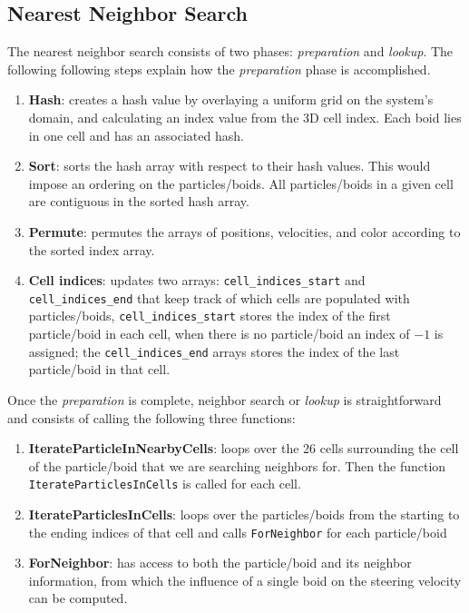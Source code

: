 \subsection{Nearest Neighbor Search}
The nearest neighbor search consists of two phases: \textit{preparation} and \textit{lookup}. The following following steps explain how the \textit{preparation} phase is accomplished.

\begin{enumerate}
\item{\textbf{Hash}: creates a hash value by overlaying a uniform grid on the system's domain, and calculating an index value from the 3D cell index. Each boid lies in one cell and has an associated hash.}
\item{\textbf{Sort}: sorts the hash array with respect to their hash values. This would impose an ordering on the particles/boids. All particles/boids in a given cell are contiguous in the sorted hash array.}
\item{\textbf{Permute}:  permutes the arrays of positions, velocities, and color according to the sorted index array.}
\item{\textbf{Cell indices}: updates two arrays: \texttt{cell\_indices\_start} and \texttt{cell\_indices\_end} that keep track of which cells are populated with particles/boids, \texttt{cell\_indices\_start} stores the index of the first particle/boid in each cell, when there is no particle/boid an index of $-1$ is assigned; the \texttt{cell\_indices\_end} arrays stores the index of the last particle/boid in that cell.}
\end{enumerate}

Once the \textit{preparation} is complete, neighbor search or \textit{lookup} is straightforward and consists of calling the following three functions:  

\begin{enumerate}
\item{\textbf{IterateParticleInNearbyCells}: loops over the 26 cells surrounding the cell of the particle/boid that we are searching neighbors for. Then the function \texttt{IterateParticlesInCells} is called for each cell.}
\item{\textbf{IterateParticlesInCells}: loops over the particles/boids from the starting to the ending indices of that cell and calls \texttt{ForNeighbor} for each particle/boid}
\item{\textbf{ForNeighbor}: has access to both the particle/boid and its neighbor information, from which the influence of a single boid on the steering velocity can be computed.}
\end{enumerate}

